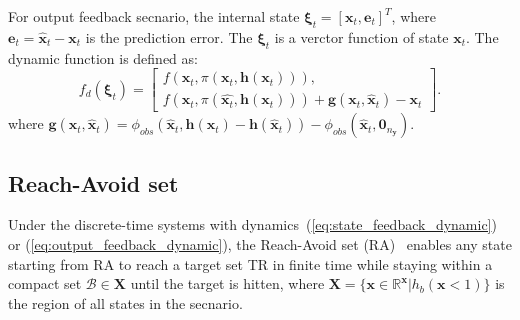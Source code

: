 \documentclass[conference]{IEEEtran}
\newcommand{\ra}{\textsc{RA}\xspace}
\newcommand{\myvec}[1]{\boldsymbol{#1}}
\newcommand{\calB}{\mathcal{B}}
\begin{document}
For output feedback secnario, 
the internal state $\myvec{\xi}_{t} = [\myvec{x}_{t},\myvec{e}_{t}]^{T}$, 
where $\myvec{e}_{t} = \hat{\myvec{x}}_{t} - \myvec{x}_{t}$ is the 
prediction error. 
The $\myvec{\xi}_{t}$ is a verctor function of state $\myvec{x}_{t}$. 
The dynamic function is defined as:
\begin{equation}\label{eq:output_feedback_dynamic}
  f_{d}(\myvec{\xi}_{t}) = \begin{bmatrix}
    f(\myvec{x}_{t}, \pi(\myvec{x}_{t}, \myvec{h}(\myvec{x}_{t}))), \\ 
    f(\myvec{x}_{t}, \pi(\hat{\myvec{x}_{t}}, \myvec{h}(\myvec{x}_{t}))) + 
    \myvec{g}(\myvec{x}_{t}, \hat{\myvec{x}}_{t}) 
    - \myvec{x}_{t}
    \end{bmatrix}.
\end{equation}
where $\myvec{g}(\myvec{x}_{t}, \hat{\myvec{x}}_{t}) = 
\phi_{obs}(\hat{\myvec{x}}_{t}, \myvec{h}(\myvec{x}_{t}) - 
\myvec{h}(\hat{\myvec{x}}_{t})) - \phi_{obs}(\hat{\myvec{x}}_{t}, 
\myvec{0}_{n_{\myvec{y}}})$. 

\subsection{Reach-Avoid set}

Under the discrete-time systems with 
dynamics~(\ref{eq:state_feedback_dynamic}) or 
(\ref{eq:output_feedback_dynamic}), 
the Reach-Avoid set 
(\ra)~\cite{xue2020inner,xue2021reach} 
enables any state starting 
from \ra to reach a target set TR in finite 
time while staying within a compact 
set $\calB \in \myvec{X}$ until 
the target is hitten, where $\myvec{X} = 
\{\myvec{x}\in \mathbb{R}^{\myvec{x}}
|h_b(\myvec{x}<1)\}$ 
is the region of all states in the secnario. 
\end{document}

